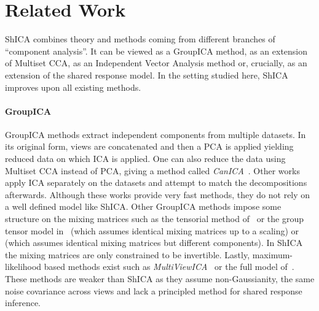 \documentclass[12pt]{report}
\begin{document}
  

\section{Related Work}
ShICA combines theory and methods coming from different branches of ``component analysis''. It can be viewed as a GroupICA method, as an extension of Multiset CCA, as an Independent Vector Analysis method or, crucially, as an extension of the shared response model. In the setting studied here, ShICA improves upon all existing methods.

\paragraph{GroupICA}
GroupICA methods extract independent components from multiple datasets. In its original form\cite{calhoun2001method}, views are concatenated and then a PCA is applied yielding reduced data on which ICA is applied. One can also reduce the data using Multiset CCA instead of PCA, giving a method called \emph{CanICA}~\cite{varoquaux2009canica}. Other works~\cite{Esposito05NI, Hyva11NI} apply ICA separately on the datasets and attempt to match the decompositions afterwards.
Although these works provide very fast methods, they do not rely on a well defined model like ShICA. %
Other GroupICA methods impose some structure on the mixing matrices such as the tensorial method of~\cite{beckmann2005tensorial} or the group tensor model in~\cite{guo2008unified} (which assumes identical mixing matrices up to a scaling) or \cite{svensen2002ica} (which assumes identical mixing matrices but different components). In ShICA the mixing matrices are only constrained to be invertible.
Lastly, maximum-likelihood based methods exist such as \emph{MultiViewICA}~\cite{richard2020modeling} or the full model of~\cite{guo2008unified}. These methods are weaker than ShICA as they assume non-Gaussianity, the same noise covariance across views and lack a principled method for shared response inference.
\end{document}
